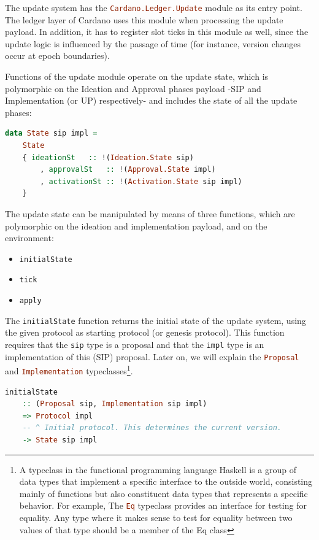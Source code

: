 The update system has the \lstinline[language=Haskell]!Cardano.Ledger.Update!
module as its entry
point. The ledger layer of Cardano uses this module when processing the update
payload. In addition, it has to register slot ticks in this module as well,
since the update logic is influenced by the passage of time (for instance,
version changes occur at epoch boundaries).

Functions of the update module operate on the update state, which is
polymorphic on the Ideation and Approval phases payload -SIP and
Implementation (or UP) respectively- and includes the state of
all the update phases:


\begin{lstlisting}[language=Haskell]
	data State sip impl =
	State
	{ ideationSt   :: !(Ideation.State sip)
		, approvalSt   :: !(Approval.State impl)
		, activationSt :: !(Activation.State sip impl)
	}
\end{lstlisting}

The update state can be manipulated by means of three functions, which are
polymorphic on the ideation and implementation payload, and on the environment:
\begin{itemize}
	\item \lstinline[language=Haskell]!initialState!
	\item \lstinline[language=Haskell]!tick!
	\item \lstinline[language=Haskell]!apply!
\end{itemize}

The \lstinline[language=Haskell]!initialState! function returns the initial
state of the update
system, using the given protocol as starting protocol (or genesis protocol).
This function requires that the \lstinline[language=Haskell]!sip! type is a
proposal and that the
\lstinline[language=Haskell]!impl! type is an implementation of this (SIP)
proposal. Later on, we
will explain the \lstinline[language=Haskell]!Proposal! and
\lstinline[language=Haskell]!Implementation! typeclasses\footnote{A typeclass
	in the functional programming language Haskell is a group of data types
	that
	implement a specific interface to the outside world, consisting mainly of
	functions but also constituent data types that represents a specific
	behavior.
	For example, The \lstinline[language=Haskell]!Eq! typeclass provides an
	interface for testing for equality. Any type where it makes sense to test
	for
	equality between two values of that type should be a member of the Eq
	class}.

\begin{lstlisting}[language=Haskell]
	initialState
	:: (Proposal sip, Implementation sip impl)
	=> Protocol impl
	-- ^ Initial protocol. This determines the current version.
	-> State sip impl
\end{lstlisting}

